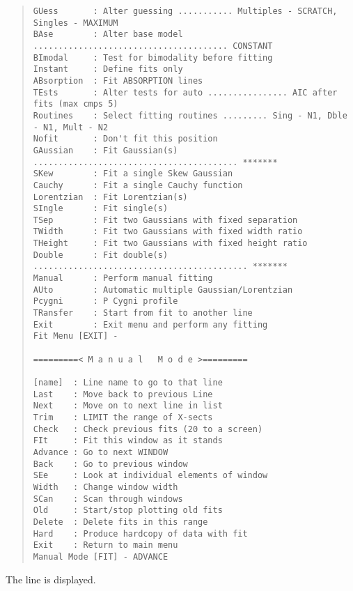 \begin{quote}
\begin{verbatim}
GUess       : Alter guessing ........... Multiples - SCRATCH, Singles - MAXIMUM
BAse        : Alter base model ....................................... CONSTANT
BImodal     : Test for bimodality before fitting
Instant     : Define fits only
ABsorption  : Fit ABSORPTION lines
TEsts       : Alter tests for auto ................ AIC after fits (max cmps 5)
Routines    : Select fitting routines ......... Sing - N1, Dble - N1, Mult - N2
Nofit       : Don't fit this position
GAussian    : Fit Gaussian(s) ......................................... *******
SKew        : Fit a single Skew Gaussian
Cauchy      : Fit a single Cauchy function
Lorentzian  : Fit Lorentzian(s)
SIngle      : Fit single(s)
TSep        : Fit two Gaussians with fixed separation
TWidth      : Fit two Gaussians with fixed width ratio
THeight     : Fit two Gaussians with fixed height ratio
Double      : Fit double(s) ........................................... *******
Manual      : Perform manual fitting
AUto        : Automatic multiple Gaussian/Lorentzian
Pcygni      : P Cygni profile
TRansfer    : Start from fit to another line
Exit        : Exit menu and perform any fitting
Fit Menu [EXIT] -

=========< M a n u a l   M o d e >=========

[name]  : Line name to go to that line
Last    : Move back to previous Line
Next    : Move on to next line in list
Trim    : LIMIT the range of X-sects
Check   : Check previous fits (20 to a screen)
FIt     : Fit this window as it stands
Advance : Go to next WINDOW
Back    : Go to previous window
SEe     : Look at individual elements of window
Width   : Change window width
SCan    : Scan through windows
Old     : Start/stop plotting old fits
Delete  : Delete fits in this range
Hard    : Produce hardcopy of data with fit
Exit    : Return to main menu
Manual Mode [FIT] - ADVANCE
\end{verbatim}\end{quote}
The line is displayed.

